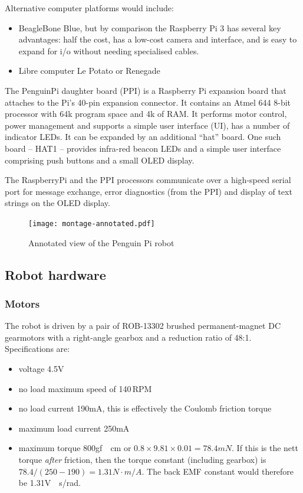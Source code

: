 \documentclass[11pt,fleqn]{article}
\begin{document}
Alternative computer platforms would include:
\begin{itemize}
\item  BeagleBone Blue, but by comparison  the Raspberry Pi 3 has several key advantages:
 half the cost, has a low-cost camera and interface, and is easy to expand for i/o without needing specialised cables.
\item  Libre computer Le Potato or Renegade
\end{itemize}

The PenguinPi daughter board (PPI) is a Raspberry Pi expansion board that attaches to the Pi's 40-pin expansion connector.
It contains an Atmel 644 8-bit processor with 64k program space and 4k of RAM.  It performs motor control, power management and supports a simple user interface (UI), has a number of indicator LEDs.
It can be expanded by an additional ``hat'' board.
One such board -- HAT1 -- provides infra-red beacon LEDs and a simple user interface comprising push buttons and a small OLED display.

The RaspberryPi and the PPI processors communicate over a high-speed serial port for message exchange, error diagnostics (from the PPI) and display of text strings on the OLED display.

\begin{figure}
\centering
\texttt{[image: montage-annotated.pdf]}
\caption{Annotated view of the Penguin Pi robot}\label{fig:robot-annotated}
\end{figure}

\subsection{Robot hardware}
\subsubsection{Motors}
The robot is driven by a pair of ROB-13302 brushed permanent-magnet DC gearmotors with a right-angle gearbox and a reduction ratio of 48:1.  Specifications are:
\begin{itemize}
\item voltage 4.5\unit{V}
\item no load maximum speed of 140\,RPM
\item no load current 190\unit{mA}, this is effectively the Coulomb friction torque
\item maximum load current 250\unit{mA}
\item maximum torque 800\unit{gf \cdot cm} or $0.8 \times 9.81 \times 0.01 =  78.4\unit{mN}$. 
If this is the nett torque \textit{after} friction, then  the torque constant (including gearbox) is $78.4/(250-190) =1.31\unit{N \cdot m/A}$.
The back EMF constant would therefore be 1.31\unit{V\cdot s/rad}.
\end{itemize}
\end{document}
